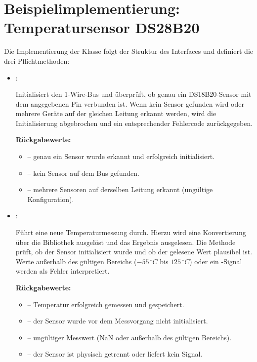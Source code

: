 %
%
\chapter{Beispielimplementierung: Temperatursensor DS28B20}
	
Die Implementierung der Klasse  folgt der Struktur des Interfaces  und definiert die drei Pflichtmethoden:
	
\begin{itemize}
  \item {}:
  
		Initialisiert den 1-Wire-Bus und überprüft, ob genau ein DS18B20-Sensor mit dem angegebenen Pin verbunden ist.  
		Wenn kein Sensor gefunden wird oder mehrere Geräte auf der gleichen Leitung erkannt werden, wird die Initialisierung abgebrochen und ein entsprechender Fehlercode zurückgegeben.  
		
		\textbf{Rückgabewerte:}
		
		\begin{itemize}
			\item {} – genau ein Sensor wurde erkannt und erfolgreich initialisiert. 
			\item {} – kein Sensor auf dem Bus gefunden. 
			\item {} – mehrere Sensoren auf derselben Leitung erkannt (ungültige Konfiguration). 
		\end{itemize}
		
    \item {}:
    
		Führt eine neue Temperaturmessung durch.  
		Hierzu wird eine Konvertierung über die Bibliothek  ausgelöst und das Ergebnis ausgelesen. Die Methode prüft, ob der Sensor initialisiert wurde und ob der gelesene Wert plausibel ist.  
		Werte au{\ss}erhalb des gültigen Bereichs (\(-55\,^\circ C\) bis \(125\,^\circ C\)) oder ein -Signal werden als Fehler interpretiert.  
		
		\textbf{Rückgabewerte:}
		
		\begin{itemize}
			\item {} – Temperatur erfolgreich gemessen und gespeichert. 
			\item {} – der Sensor wurde vor dem Messvorgang nicht initialisiert. 
			\item {} – ungültiger Messwert (NaN oder au{\ss}erhalb des gültigen Bereichs). 
			\item {} – der Sensor ist physisch getrennt oder liefert kein Signal. 
		\end{itemize}
		

\end{itemize}
